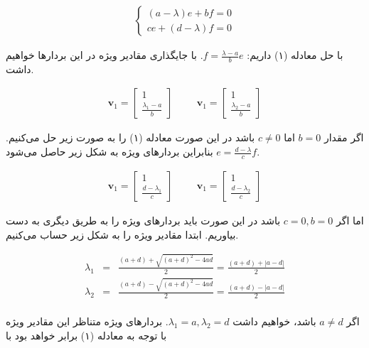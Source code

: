 \documentclass[14pt,a4]{article}
\begin{document}
\begin{eqnarray}
    \begin{cases}
        (a-\lambda)e + bf = 0 \\
        ce + (d-\lambda)f = 0
    \end{cases}
\end{eqnarray}

با حل معادله (۱) داریم: $f = \frac{\lambda - a}{b} e$. با جایگذاری مقادیر ویژه در این بردار‌ها خواهیم داشت.

\begin{eqnarray*}
    \textbf{v}_1 = \begin{bmatrix}1\\ \frac{\lambda_1 - a}{b}\end{bmatrix} \hspace{1cm} \textbf{v}_1 = \begin{bmatrix}1\\ \frac{\lambda_2 - a}{b}\end{bmatrix}
\end{eqnarray*}

اگر مقدار $b=0$ اما $c\neq 0$ باشد در این صورت معادله‌ (۱) را به صورت زیر حل می‌کنیم. $e = \frac{d-\lambda}{c}f$
بنابراین بردار‌های ویژه به شکل زیر حاصل می‌شود.

\begin{eqnarray*}
    \textbf{v}_1 = \begin{bmatrix}1\\ \frac{d - \lambda_1}{c}\end{bmatrix} \hspace{1cm} \textbf{v}_1 = \begin{bmatrix}1\\ \frac{d - \lambda_2}{c}\end{bmatrix}
\end{eqnarray*}

اما اگر $c=0, b=0$ باشد در این صورت باید بردار‌های ویژه را به طریق دیگری به دست بیاوریم. ابتدا مقادیر ویژه را
به شکل زیر حساب می‌کنیم.

\begin{eqnarray*}
    \lambda_1 & = & \frac{(a+d) + \sqrt{(a+d)^2-4ad}}{2} = \frac{(a+d) + |a-d|}{2} \\
    \lambda_2 & = & \frac{(a+d) - \sqrt{(a+d)^2-4ad}}{2} = \frac{(a+d) - |a-d|}{2}\\
\end{eqnarray*}

اگر $a \neq d$ باشد، خواهیم داشت $\lambda_1 = a, \lambda_2=d$. بردار‌های ویژه متناظر این مقادیر ویژه
با توجه به معادله‌ (۱) برابر خواهد بود با
\end{document}
